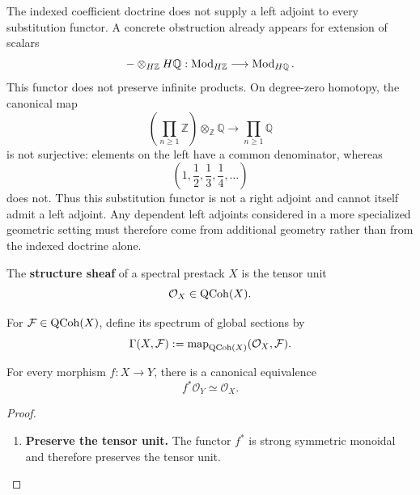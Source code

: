 \begin{remark}
\label{rem:no-general-dependent-left-adjoint-qcoh}
The indexed coefficient doctrine does not supply a left adjoint to every
substitution functor. A concrete obstruction already appears for extension
of scalars
\[
    -\otimes_{H\mathbb Z}H\mathbb Q:
    \operatorname{Mod}_{H\mathbb Z}
    \longrightarrow
    \operatorname{Mod}_{H\mathbb Q}.
\]
This functor does not preserve infinite products. On degree-zero homotopy,
the canonical map
\[
    \left(\prod_{n\geq1}\mathbb Z\right)\otimes_{\mathbb Z}\mathbb Q
    \longrightarrow
    \prod_{n\geq1}\mathbb Q
\]
is not surjective: elements on the left have a common denominator, whereas
\[
    \left(1,\frac12,\frac13,\frac14,\ldots\right)
\]
does not. Thus this substitution functor is not a right adjoint and cannot
itself admit a left adjoint. Any dependent left adjoints considered in a
more specialized geometric setting must therefore come from additional
geometry rather than from the indexed doctrine alone.
\end{remark}

\begin{definition}
\label{def:structure-sheaf-prestack}
The \textbf{structure sheaf} of a spectral prestack $X$ is the tensor unit
\[
    \mathcal O_X
    \in
    \operatorname{QCoh}(X).
\]
\end{definition}

\begin{definition}
\label{def:global-sections-qcoh}
For $\mathcal F\in\operatorname{QCoh}(X)$, define its spectrum of global sections by
\[
    \Gamma(X,\mathcal F)
    :=
    \operatorname{map}_{\operatorname{QCoh}(X)}
    (\mathcal O_X,\mathcal F).
\]
\end{definition}

\begin{proposition}
\label{prop:pullback-structure-sheaf}
For every morphism $f:X\to Y$, there is a canonical equivalence
\[
    f^*\mathcal O_Y
    \simeq
    \mathcal O_X.
\]
\end{proposition}

\begin{proof}
\leavevmode
\begin{enumerate}[label=\textup{(\arabic*)}]
    \item \textbf{Preserve the tensor unit.}
    The functor $f^*$ is strong symmetric monoidal and therefore preserves the
    tensor unit.
\end{enumerate}
\end{proof}

